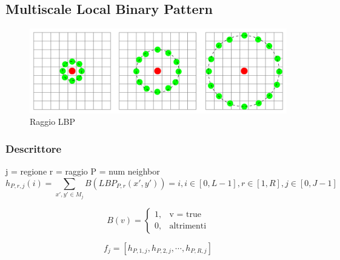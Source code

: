 \subsection{Multiscale Local Binary Pattern}

\begin{figure}[ht]
\begin{center}
\includegraphics[width=.95\textwidth]{img/raggio_LBP}
\caption{ Raggio LBP }
\end{center}
\end{figure}

\subsubsection{Descrittore}

j = regione
r = raggio
P = num neighbor
\begin{equation}
h_{P,r,j}(i) = \sum_{x',y' \in M_j} B(LBP_{P,r}(x', y')) = i, i \in  [0, L-1 ], r \in [1, R], j \in [0, J-1]
\end{equation}

\begin{equation}
B(v) = 	\begin{cases} 1, & \mbox{v = true} \\ 0, & \mbox{altrimenti} \end{cases}
\end{equation}

\begin{equation}
f_{j} = [h_{P, 1, j}, h_{P, 2, j}, \cdots, h_{P, R, j}]
\end{equation}

